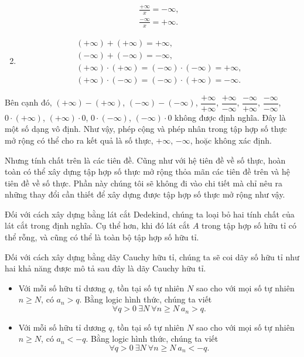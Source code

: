 \begin{enumerate}[label={(\roman*)}]
\[\begin{split}
                  \frac{+\infty}{x} = -\infty, \\
                  \frac{-\infty}{x} = +\infty.
              \end{split}
          \]
    \item \[
              \begin{split}
                  (+\infty) + (+\infty) = +\infty, \\
                  (-\infty) + (-\infty) = -\infty, \\
                  (+\infty)\cdot (+\infty) = (-\infty)\cdot (-\infty) = +\infty, \\
                  (+\infty)\cdot (-\infty) = (-\infty)\cdot (+\infty) = -\infty.
              \end{split}
          \]
\end{enumerate}

Bên cạnh đó, $(+\infty) - (+\infty)$, $(-\infty) - (-\infty)$, $\dfrac{+\infty}{+\infty}$, $\dfrac{+\infty}{-\infty}$, $\dfrac{-\infty}{+\infty}$, $\dfrac{-\infty}{-\infty}$, $0\cdot (+\infty)$, $(+\infty)\cdot 0$, $0\cdot (-\infty)$, $(-\infty)\cdot 0$ không được định nghĩa. Đây là một số dạng vô định. Như vậy, phép cộng và phép nhân trong tập hợp số thực mở rộng có thể cho ra kết quả là số thực, $+\infty$, $-\infty$, hoặc không xác định.

Nhưng tính chất trên là các tiên đề. Cũng như với hệ tiên đề về số thực, hoàn toàn có thể xây dựng tập hợp số thực mở rộng thỏa mãn các tiên đề trên và hệ tiên đề về số thực. Phần này chúng tôi sẽ không đi vào chi tiết mà chỉ nêu ra những thay đổi cần thiết để xây dựng được tập hợp số thực mở rộng như vậy.

Đối với cách xây dựng bằng lát cắt Dedekind, chúng ta loại bỏ hai tính chất của lát cắt trong định nghĩa. Cụ thể hơn, khi đó lát cắt $A$ trong tập hợp số hữu tỉ có thể rỗng, và cũng có thể là toàn bộ tập hợp số hữu tỉ.

Đối với cách xây dựng bằng dãy Cauchy hữu tỉ, chúng ta sẽ coi dãy số hữu tỉ như hai khả năng được mô tả sau đây là dãy Cauchy hữu tỉ.
\begin{itemize}
    \item Với mỗi số hữu tỉ dương $q$, tồn tại số tự nhiên $N$ sao cho với mọi số tự nhiên $n\geq N$, có $a_{n} > q$. Bằng logic hình thức, chúng ta viết
          \[
              \forall q > 0\ \exists N\ \forall n\geq N\ a_{n} > q.
          \]
    \item Với mỗi số hữu tỉ dương $q$, tồn tại số tự nhiên $N$ sao cho với mọi số tự nhiên $n\geq N$, có $a_{n} < -q$. Bằng logic hình thức, chúng ta viết
          \[
              \forall q > 0\ \exists N\ \forall n\geq N\ a_{n} < -q.
          \]
\end{itemize}

